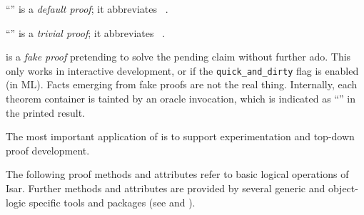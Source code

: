 \begin{isabellebody}
\begin{isamarkuptext}
\begin{descr}
  \item [``\mbox{\isa{\isacommand{{\isachardot}{\isachardot}}}}''] is a \emph{default
  proof}; it abbreviates \mbox{}~.

  \item [``\mbox{\isa{\isacommand{{\isachardot}}}}''] is a \emph{trivial
  proof}; it abbreviates \mbox{}~.
  
  \item [\mbox{\isa{\isacommand{sorry}}}] is a \emph{fake proof}
  pretending to solve the pending claim without further ado.  This
  only works in interactive development, or if the \verb|quick_and_dirty| flag is enabled (in ML).  Facts emerging from fake
  proofs are not the real thing.  Internally, each theorem container
  is tainted by an oracle invocation, which is indicated as ``\isa{{\isachardoublequote}{\isacharbrackleft}{\isacharbang}{\isacharbrackright}{\isachardoublequote}}'' in the printed result.
  
  The most important application of \mbox{} is to support
  experimentation and top-down proof development.

  \end{descr}%
\end{isamarkuptext}%
\isamarkuptrue%
%
\isamarkuptrue%
%
\begin{isamarkuptext}%
The following proof methods and attributes refer to basic logical
  operations of Isar.  Further methods and attributes are provided by
  several generic and object-logic specific tools and packages (see
   and ).


\end{isamarkuptext}
\end{isabellebody}
